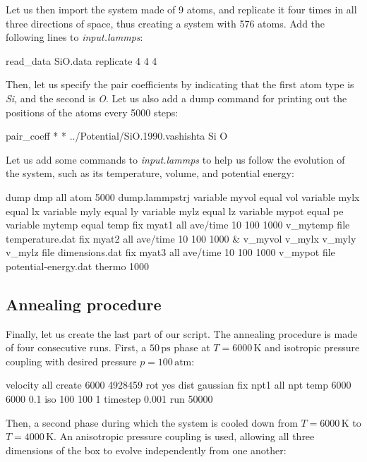 \noindent Let us then import the system made of 9 atoms, and replicate it four times in all three
directions of space, thus creating a system with 576 atoms. Add the following lines
to \textit{input.lammps}:

\begin{lcverbatim}
read_data SiO.data
replicate 4 4 4
\end{lcverbatim}

\noindent Then, let us specify the pair coefficients by indicating
that the first atom type is \textit{Si}, and
the second is \textit{O}. Let us also
add a dump command for printing out the positions of the
atoms every 5000 steps:

\begin{lcverbatim}
pair_coeff * * ../Potential/SiO.1990.vashishta Si O
\end{lcverbatim}

\noindent Let us add some commands to \textit{input.lammps} to help us follow the evolution of the system,
such as its temperature, volume, and potential energy:

\begin{lcverbatim}
dump dmp all atom 5000 dump.lammpstrj
variable myvol equal vol
variable mylx equal lx
variable myly equal ly
variable mylz equal lz
variable mypot equal pe
variable mytemp equal temp
fix myat1 all ave/time 10 100 1000 v_mytemp file temperature.dat
fix myat2 all ave/time 10 100 1000 & 
v_myvol v_mylx v_myly v_mylz file dimensions.dat
fix myat3 all ave/time 10 100 1000 v_mypot file potential-energy.dat
thermo 1000
\end{lcverbatim}

\subsection{Annealing procedure}
Finally, let us create the last part of our script. The
annealing procedure is made of four consecutive runs.
First, a $50\,\text{ps}$
phase at $T = 6000\,\text{K}$
and isotropic pressure coupling with desired pressure $p = 100\,\text{atm}$:

\begin{lcverbatim}
velocity all create 6000 4928459 rot yes dist gaussian
fix npt1 all npt temp 6000 6000 0.1 iso 100 100 1
timestep 0.001
run 50000
\end{lcverbatim}

\noindent Then, a second phase during which the system is cooled down
from $T = 6000\,\text{K}$
to $T = 4000\,\text{K}$.
An anisotropic pressure coupling is used, allowing all three
dimensions of the box to evolve independently from one another:

